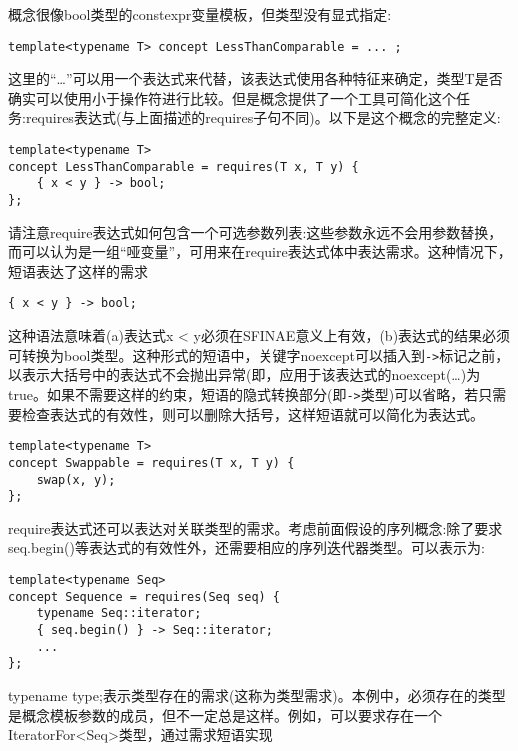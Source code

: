 概念很像bool类型的constexpr变量模板，但类型没有显式指定:

\begin{lstlisting}[style=styleCXX]
template<typename T> concept LessThanComparable = ... ;
\end{lstlisting}

这里的“…”可以用一个表达式来代替，该表达式使用各种特征来确定，类型T是否确实可以使用小于操作符进行比较。但是概念提供了一个工具可简化这个任务:requires表达式(与上面描述的requires子句不同)。以下是这个概念的完整定义:

\begin{lstlisting}[style=styleCXX]
template<typename T>
concept LessThanComparable = requires(T x, T y) {
	{ x < y } -> bool;
};
\end{lstlisting}

请注意require表达式如何包含一个可选参数列表:这些参数永远不会用参数替换，而可以认为是一组“哑变量”，可用来在require表达式体中表达需求。这种情况下，短语表达了这样的需求

\begin{lstlisting}[style=styleCXX]
{ x < y } -> bool;
\end{lstlisting}

这种语法意味着(a)表达式x < y必须在SFINAE意义上有效，(b)表达式的结果必须可转换为bool类型。这种形式的短语中，关键字noexcept可以插入到\texttt{->}标记之前，以表示大括号中的表达式不会抛出异常(即，应用于该表达式的noexcept(…)为true。如果不需要这样的约束，短语的隐式转换部分(即\texttt{->}类型)可以省略，若只需要检查表达式的有效性，则可以删除大括号，这样短语就可以简化为表达式。

\begin{lstlisting}[style=styleCXX]
template<typename T>
concept Swappable = requires(T x, T y) {
	swap(x, y);
};
\end{lstlisting}

require表达式还可以表达对关联类型的需求。考虑前面假设的序列概念:除了要求seq.begin()等表达式的有效性外，还需要相应的序列迭代器类型。可以表示为:

\begin{lstlisting}[style=styleCXX]
template<typename Seq>
concept Sequence = requires(Seq seq) {
	typename Seq::iterator;
	{ seq.begin() } -> Seq::iterator;
	...
};
\end{lstlisting}

typename type;表示类型存在的需求(这称为类型需求)。本例中，必须存在的类型是概念模板参数的成员，但不一定总是这样。例如，可以要求存在一个IteratorFor<Seq>类型，通过需求短语实现

